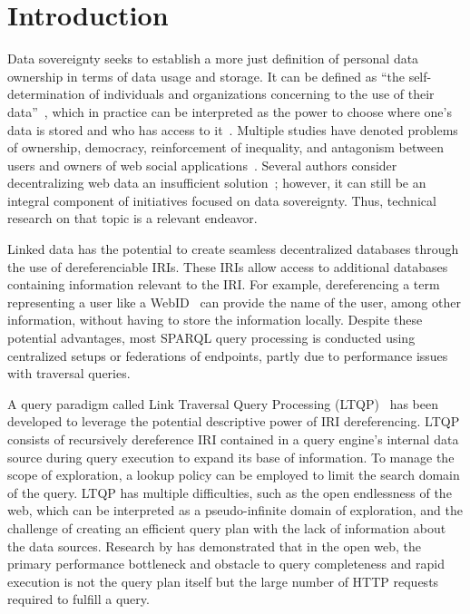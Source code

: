 \section{Introduction}

Data sovereignty seeks to establish a more just definition of personal data ownership in terms of data usage and storage.
It can be defined as ``the self-determination of individuals and organizations concerning to the use of their data''~\cite{verstraete2022solid},
which in practice can be interpreted as the power to choose where one's data is stored and who has access to it~\cite{verstraete2022solid}.
Multiple studies have denoted problems of ownership, democracy, reinforcement of inequality, and antagonism between users and owners of web social applications~\cite{Terranova2000FreeLP, Curran2016ch1, Sevignani2013, 9663788}.
Several authors consider decentralizing web data an insufficient solution~\cite{9663788, Curran2016ch1}; however, it can still be an integral component of initiatives focused on data sovereignty. Thus, technical research on that topic is a relevant endeavor.

Linked data has the potential to create seamless decentralized databases through the use of dereferenciable IRIs.
These IRIs allow access to additional databases containing information relevant to the IRI.
For example, dereferencing a term representing a user like a WebID~ can provide the name of the user, among other information, without having 
to store the information locally.
Despite these potential advantages, most SPARQL query processing is conducted using centralized setups or federations of endpoints, partly due to performance issues with traversal queries.

A query paradigm called Link Traversal Query Processing (LTQP)~\cite{Hartig2012} has been developed to leverage the potential descriptive power of IRI dereferencing.
LTQP consists of recursively dereference IRI contained in a query engine's internal data source during query execution to expand its base of information.
To manage the scope of exploration, a lookup policy can be employed to limit the search domain of the query.
LTQP has multiple difficulties, such as the open endlessness of the web, which can be interpreted as a pseudo-infinite domain of exploration,
and the challenge of creating an efficient query plan with the lack of information about the data sources. 
Research by \citeauthor{hartig2016walking} has demonstrated that in the open web, the primary performance bottleneck and obstacle to query completeness and rapid execution is not the query plan itself but the large number of HTTP requests required to fulfill a query.

